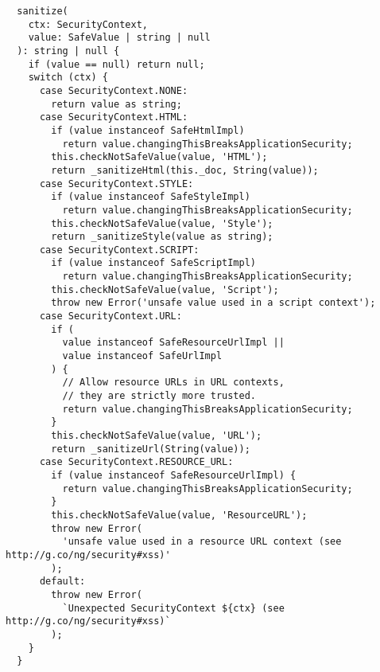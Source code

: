 \begin{verbatim}
  sanitize(
    ctx: SecurityContext,
    value: SafeValue | string | null
  ): string | null {
    if (value == null) return null;
    switch (ctx) {
      case SecurityContext.NONE:
        return value as string;
      case SecurityContext.HTML:
        if (value instanceof SafeHtmlImpl)
          return value.changingThisBreaksApplicationSecurity;
        this.checkNotSafeValue(value, 'HTML');
        return _sanitizeHtml(this._doc, String(value));
      case SecurityContext.STYLE:
        if (value instanceof SafeStyleImpl)
          return value.changingThisBreaksApplicationSecurity;
        this.checkNotSafeValue(value, 'Style');
        return _sanitizeStyle(value as string);
      case SecurityContext.SCRIPT:
        if (value instanceof SafeScriptImpl)
          return value.changingThisBreaksApplicationSecurity;
        this.checkNotSafeValue(value, 'Script');
        throw new Error('unsafe value used in a script context');
      case SecurityContext.URL:
        if (
          value instanceof SafeResourceUrlImpl ||
          value instanceof SafeUrlImpl
        ) {
          // Allow resource URLs in URL contexts,
          // they are strictly more trusted.
          return value.changingThisBreaksApplicationSecurity;
        }
        this.checkNotSafeValue(value, 'URL');
        return _sanitizeUrl(String(value));
      case SecurityContext.RESOURCE_URL:
        if (value instanceof SafeResourceUrlImpl) {
          return value.changingThisBreaksApplicationSecurity;
        }
        this.checkNotSafeValue(value, 'ResourceURL');
        throw new Error(
          'unsafe value used in a resource URL context (see http://g.co/ng/security#xss)'
        );
      default:
        throw new Error(
          `Unexpected SecurityContext ${ctx} (see http://g.co/ng/security#xss)`
        );
    }
  }
\end{verbatim}
